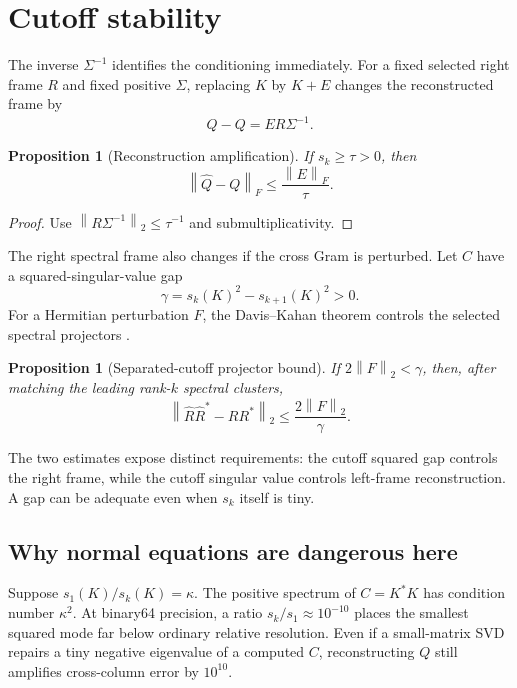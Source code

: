 \documentclass[11pt]{article}
\newtheorem{proposition}[theorem]{Proposition}
\theoremstyle{definition}
\theoremstyle{remark}
\newcommand{\norm}[1]{\left\lVert#1\right\rVert}
\begin{document}
\section{Cutoff stability}
\label{sec:stability}

The inverse $\Sigma^{-1}$ identifies the conditioning immediately.  For a
fixed selected right frame $R$ and fixed positive $\Sigma$, replacing $K$ by
$K+E$ changes the reconstructed frame by
\[
 \widehat Q-Q=ER\Sigma^{-1}.
\]

\begin{proposition}[Reconstruction amplification]
\label{prop:reconstruction}
If $s_k\ge\tau>0$, then
\begin{equation}
 \norm{\widehat Q-Q}_F
 \le \frac{\norm E_F}{\tau}.
 \label{eq:reconstruction-bound}
\end{equation}
\end{proposition}

\begin{proof}
Use $\norm{R\Sigma^{-1}}_2\le\tau^{-1}$ and submultiplicativity.
\end{proof}

The right spectral frame also changes if the cross Gram is perturbed.  Let
$C$ have a squared-singular-value gap
\[
 \gamma=s_k(K)^2-s_{k+1}(K)^2>0.
\]
For a Hermitian perturbation $F$, the Davis--Kahan theorem controls the
selected spectral projectors \citep{DavisKahan1970,StewartSun1990}.

\begin{proposition}[Separated-cutoff projector bound]
\label{prop:projector}
If $2\norm F_2<\gamma$, then, after matching the leading rank-$k$ spectral
clusters,
\begin{equation}
 \norm{\widehat R\widehat R^*-RR^*}_2
 \le \frac{2\norm F_2}{\gamma}.
 \label{eq:projector-bound}
\end{equation}
\end{proposition}

The two estimates expose distinct requirements: the cutoff squared gap
controls the right frame, while the cutoff singular value controls left-frame
reconstruction.  A gap can be adequate even when $s_k$ itself is tiny.

\subsection{Why normal equations are dangerous here}

Suppose $s_1(K)/s_k(K)=\kappa$.  The positive spectrum of $C=K^*K$ has
condition number $\kappa^2$.  At binary64 precision, a ratio
$s_k/s_1\approx10^{-10}$ places the smallest squared mode far below ordinary
relative resolution.  Even if a small-matrix SVD repairs a tiny negative
eigenvalue of a computed $C$, reconstructing $Q$ still amplifies cross-column
error by $10^{10}$.
\end{document}
